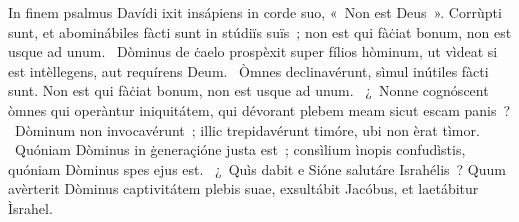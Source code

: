 { In finem psalmus Davídi}
{%
ixit insápiens in corde suo, «~Non est Deus~». Corrùpti sunt, et abominábiles fàcti sunt in stúdiïs suïs~; non est qui fàċiat bonum, non est usque ad unum. 
~Dòminus de ċaelo prospèxit super fílios hòminum, ut vìdeat si est intèllegens, aut requírens Deum. 
~Òmnes declinavérunt, sìmul inútiles fàcti sunt. Non est qui fàċiat bonum, non est usque ad unum. 
~¿~Nonne cognóscent òmnes qui operàntur iniquitátem, qui dévorant plebem meam sicut escam panis~? 
~Dòminum non invocavérunt~; illic trepidavérunt timóre, ubi non èrat tìmor. 
~Quóniam Dòminus in ġeneraçióne justa est~; consìlium ìnopis confudìstis, quóniam Dòminus spes ejus est. 
~¿~Quìs dabit e Sióne salutáre Israhélis~? Quum avèrterit Dòminus captivitátem plebis suae, exsultábit Jacóbus, et laetábitur Ìsrahel. 
}
